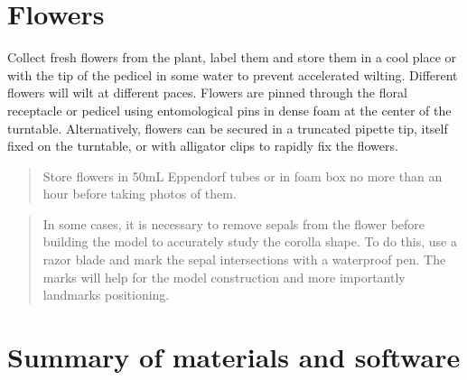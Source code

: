 \documentclass[
]{book}
\begin{document}
\hypertarget{flowers}{%
\section{Flowers}\label{flowers}}

Collect fresh flowers from the plant, label them and store them in a
cool place or with the tip of the pedicel in some water to prevent
accelerated wilting. Different flowers will wilt at different paces.
Flowers are pinned through the floral receptacle or pedicel using
entomological pins in dense foam at the center of the turntable.
Alternatively, flowers can be secured in a truncated pipette tip, itself
fixed on the turntable, or with alligator clips to rapidly fix the
flowers.

\begin{quote}
Store flowers in 50mL Eppendorf tubes or in foam box no more than an
hour before taking photos of them.
\end{quote}

\begin{quote}
In some cases, it is necessary to remove sepals from the flower before
building the model to accurately study the corolla shape. To do this,
use a razor blade and mark the sepal intersections with a waterproof
pen. The marks will help for the model construction and more importantly
landmarks positioning.
\end{quote}

\hypertarget{summary-of-materials-and-software}{%
\section{Summary of materials and software}\label{summary-of-materials-and-software}}
\end{document}
